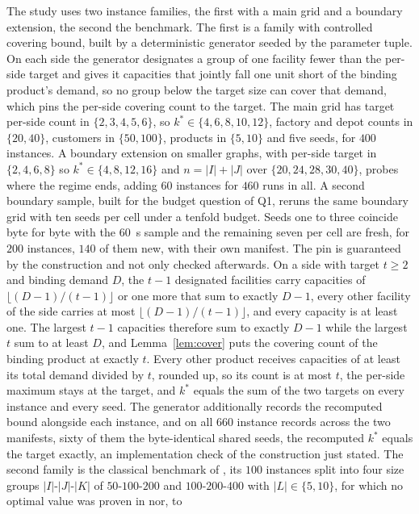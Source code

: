 The study uses two instance families, the first with a main grid and a
boundary extension, the second the benchmark. The first is a family with controlled
covering bound, built by a deterministic generator seeded by the
parameter tuple. On each side the generator designates a group of one
facility fewer than the per-side target and gives it capacities that
jointly fall one unit short of the binding product's demand, so no
group below the target size can cover that demand, which pins the
per-side covering count to the target. The main
grid has target per-side count in $\{2,3,4,5,6\}$, so $k^\ast\in\{4,6,8,10,12\}$,
factory and depot counts in $\{20,40\}$, customers in $\{50,100\}$, products in
$\{5,10\}$ and five seeds, for $400$ instances. A boundary extension on
smaller graphs, with per-side target in $\{2,4,6,8\}$ so
$k^\ast\in\{4,8,12,16\}$ and $n=|I|+|J|$ over $\{20,24,28,30,40\}$, probes where
the regime ends, adding $60$ instances for $460$ runs in all. A second
boundary sample, built for the budget question of Q1, reruns the same
boundary grid with ten seeds per cell under a tenfold budget. Seeds one
to three coincide byte for byte with the $60$~s sample and the remaining
seven per cell are fresh, for $200$ instances, $140$ of them new, with
their own manifest. The pin is
guaranteed by the construction and not only checked afterwards. On a
side with target $t\ge 2$ and binding demand $D$, the $t-1$
designated facilities carry capacities of
$\lfloor(D-1)/(t-1)\rfloor$ or one more that sum to exactly $D-1$,
every other facility of the side carries at most
$\lfloor(D-1)/(t-1)\rfloor$, and every capacity is at least one. The
largest $t-1$ capacities therefore sum to exactly $D-1$ while the
largest
$t$ sum to at least $D$, and Lemma~\ref{lem:cover} puts the covering
count of the binding product at exactly $t$. Every other product
receives capacities of at least its total demand divided by $t$,
rounded up, so its count is at most $t$, the per-side maximum stays at
the target, and $k^\ast$ equals the sum of the two targets on every
instance and every seed. The
generator additionally records the recomputed bound alongside each
instance, and on
all $660$ instance records across the two manifests, sixty of them the
byte-identical shared seeds, the recomputed $k^\ast$ equals the target
exactly, an implementation check of the construction just stated.
The second family is the classical
benchmark of \citet{MauriEtAl2021}, its $100$ instances split into four size
groups $|I|$-$|J|$-$|K|$ of $50$-$100$-$200$ and $100$-$200$-$400$ with
$|L|\in\{5,10\}$, for which no optimal value was proven in \citet{MauriEtAl2021} nor, to

